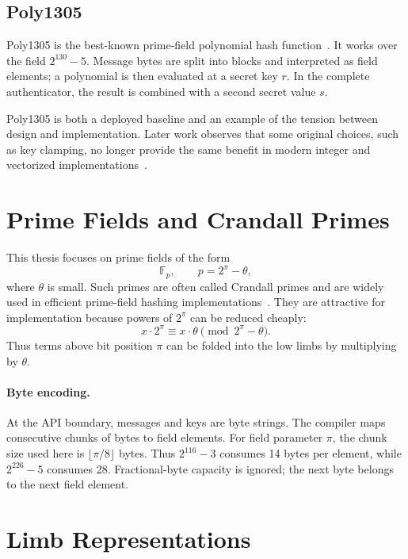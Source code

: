 \subsection{Poly1305}
\label{subsec:poly1305}

Poly1305 is the best-known prime-field polynomial hash function~\cite{bernstein2005poly1305aes}. It works over the field \(2^{130}-5\). Message bytes are split into blocks and interpreted as field elements; a polynomial is then evaluated at a secret key \(r\). In the complete authenticator, the result is combined with a second secret value \(s\).

Poly1305 is both a deployed baseline and an example of the tension between design and implementation. Later work observes that some original choices, such as key clamping, no longer provide the same benefit in modern integer and vectorized implementations~\cite{degabriele2024sok}.

\section{Prime Fields and Crandall Primes}
\label{sec:prime-fields}

This thesis focuses on prime fields of the form
\[
    \mathbb{F}_p,\qquad p = 2^\pi - \theta,
\]
where \(\theta\) is small. Such primes are often called Crandall primes and are widely used in efficient prime-field hashing implementations~\cite{degabriele2024sok,pegolotti2026sphgen}. They are attractive for implementation because powers of \(2^\pi\) can be reduced cheaply:
\[
    x \cdot 2^\pi \equiv x \cdot \theta \pmod{2^\pi - \theta}.
\]
Thus terms above bit position \(\pi\) can be folded into the low limbs by multiplying by \(\theta\).

\paragraph{Byte encoding.}
At the API boundary, messages and keys are byte strings. The compiler maps consecutive chunks of bytes to field elements. For field parameter \(\pi\), the chunk size used here is \(\lfloor \pi/8 \rfloor\) bytes. Thus \(2^{116}-3\) consumes 14 bytes per element, while \(2^{226}-5\) consumes 28. Fractional-byte capacity is ignored; the next byte belongs to the next field element.

\section{Limb Representations}
\label{sec:limb-representations}

